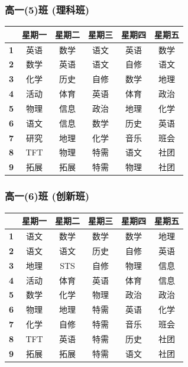 \documentclass[a4paper]{article}
\begin{document}
  \subsubsection{高一(5)班 (理科班)}
   \begin{tabular}{|c|c|c|c|c|c|}
   \hline
   & \bf 星期一 & \bf 星期二 & \bf 星期三 & \bf 星期四 & \bf 星期五 \\\hline
   \bf 1 & 英语 & 数学 & 语文 & 英语 & 数学 \\\hline
   \bf 2 & 数学 & 英语 & 语文 & 自修 & 语文 \\\hline
   \bf 3 & 化学 & 历史 & 自修 & 数学 & 地理 \\\hline
   \bf 4 & 活动 & 体育 & 英语 & 体育 & 政治 \\\hline
   \bf 5 & 物理 & 信息 & 政治 & 地理 & 化学 \\\hline
   \bf 6 & 语文 & 信息 & 数学 & 历史 & 英语 \\\hline
   \bf 7 & 研究 & 地理 & 化学 & 音乐 & 班会 \\\hline
   \bf 8 & TFT  & 物理 & 特需 & 语文 & 社团 \\\hline
   \bf 9 & 拓展 & 拓展 & 特需 & 物理 & 社团 \\\hline
   \end{tabular}
  \subsubsection{高一(6)班 (创新班)}
   \begin{tabular}{|c|c|c|c|c|c|}
   \hline
   & \bf 星期一 & \bf 星期二 & \bf 星期三 & \bf 星期四 & \bf 星期五 \\\hline
   \bf 1 & 语文 & 数学 & 数学 & 数学 & 地理 \\\hline
   \bf 2 & 语文 & 语文 & 历史 & 自修 & 英语 \\\hline
   \bf 3 & 地理 & STS & 自修 & 物理 & 信息 \\\hline
   \bf 4 & 活动 & 体育 & 英语 & 体育 & 信息 \\\hline
   \bf 5 & 数学 & 化学 & 物理 & 政治 & 政治 \\\hline
   \bf 6 & 物理 & 地理 & 特需 & 英语 & 化学 \\\hline
   \bf 7 & 化学 & 自修 & 特需 & 音乐 & 班会 \\\hline
   \bf 8 & TFT & 英语 & 特需 & 历史 & 社团 \\\hline
   \bf 9 & 拓展 & 拓展 & 特需 & 语文 & 社团 \\\hline
   \end{tabular}
 \clearpage
\end{document}

